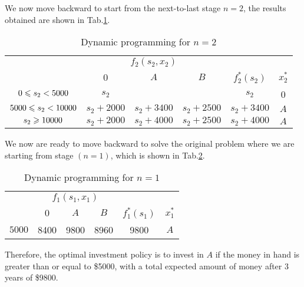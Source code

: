 \documentclass[a4paper]{article}
\begin{document}
\begin{enumerate}
\begin{solution}
	We now move backward to start from the next-to-last stage $n=2$, the results obtained are shown in Tab.\ref{tab32}.
	\begin{table}[H]
	  	\centering
	  	\caption{Dynamic programming for $n=2$}
	  	\label{tab32}
	  	\begin{tabular}{cccccc}
	  		\toprule[1.5pt]
	  		&\multicolumn{3}{c}{$f_2(s_2,x_2)$}&\\
	  		\cmidrule{2-4}
	  		\diagbox[width=9em]{$s_2$}{$x_2$}&\hspace*{0.4cm}0\hspace*{0.4cm}&\hspace*{0.4cm}$A$\hspace*{0.4cm}&\hspace*{0.4cm}$B$\hspace*{0.4cm}&$f_2^*(s_2)$&$x_2^*$\\
	  		\midrule
			$0\leqslant s_2<5000$&$s_2$&&&$s_2$&0\\
			$5000\leqslant s_2<10000$&$s_2+2000$&$s_2+3400$&$s_2+2500$&$s_2+3400$&$A$\\
			$ s_2\geqslant10000$&$s_2+2000$&$s_2+4000$&$s_2+2500$&$s_2+4000$&$A$\\
	  		\bottomrule[1.5pt]
	  	\end{tabular}
  	\end{table}
	We now are ready to move backward to solve the original problem where we are starting from stage $(n=1)$, which is shown in Tab.\ref{tab31}.
	\begin{table}[H]
	  	\centering
	  	\caption{Dynamic programming for $n=1$}
	  	\label{tab31}
	  	\begin{tabular}{cccccc}
	  		\toprule[1.5pt]
	  		&\multicolumn{3}{c}{$f_1(s_1,x_1)$}&\\
	  		\cmidrule{2-4}
	  		\diagbox[width=5em]{$s_1$}{$x_1$}&\hspace*{0.4cm}0\hspace*{0.4cm}&\hspace*{0.4cm}$A$\hspace*{0.4cm}&\hspace*{0.4cm}$B$\hspace*{0.4cm}&$f_1^*(s_1)$&$x_1^*$\\
	  		\midrule
			$5000$&8400&9800&8960&9800&$A$\\
	  		\bottomrule[1.5pt]
	  	\end{tabular}
  	\end{table}
  	
  	Therefore, the optimal investment policy is to invest in $A$ if the money in hand is greater than or equal to \$5000, with a total expected amount of money after 3 years of \$9800.
\end{solution}

\end{enumerate}
%  

%  
  
\end{document}
